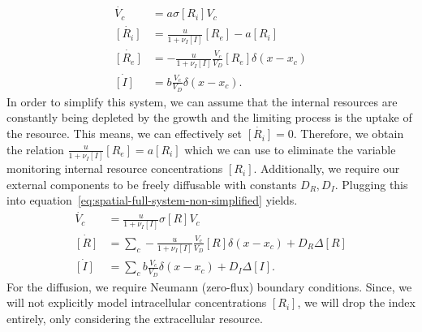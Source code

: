 \documentclass[10pt,twocolumn,5p]{elsarticle}
\numberwithin{equation}{section}
\begin{document}
\begin{align}
    \dot{V_c} &= a\sigma [R_i] V_c\\
    \dot{[R_i]} &= \frac{u}{1+\nu_I [I]} [R_e] - a[R_i]\\
    \dot{[R_e]} &= -\frac{u}{1+\nu_I [I]} \frac{V_c}{V_D} [R_e] \delta(x-x_c)\\
    \dot{[I]} &= b\frac{V_c}{V_D}\delta(x-x_c).
    \label{eq:spatial-full-system-non-simplified}
\end{align}
In order to simplify this system, we can assume that the internal resources are constantly being depleted by the growth and the limiting process is the uptake of the resource.
This means, we can effectively set $\dot{[R_i]}=0$.
Therefore, we obtain the relation $\frac{u}{1+\nu_I [I]}[R_e] = a[R_i]$ which we can use to eliminate the variable monitoring internal resource concentrations $[R_i]$.
Additionally, we require our external components to be freely diffusable with constants $D_R,D_I$.
Plugging this into equation~\eqref{eq:spatial-full-system-non-simplified} yields.
\begin{align}
    \dot{V_c} &= \frac{u}{1+\nu_I [I]} \sigma [R]V_c\\
    \dot{[R]} &= \sum\limits_c -\frac{u}{1+\nu_I [I]} \frac{V_c}{V_D} [R] \delta(x-x_c) + D_R\Delta [R]\\
    \dot{[I]} &= \sum\limits_c b\frac{V_c}{V_D}\delta(x-x_c) + D_I\Delta [I].
    \label{eq:spatial-full-system-simplified}
\end{align}
For the diffusion, we require Neumann (zero-flux) boundary conditions.
Since, we will not explicitly model intracellular concentrations $[R_i]$, we will drop the index entirely, only considering the extracellular resource.
%
%
\end{document}
